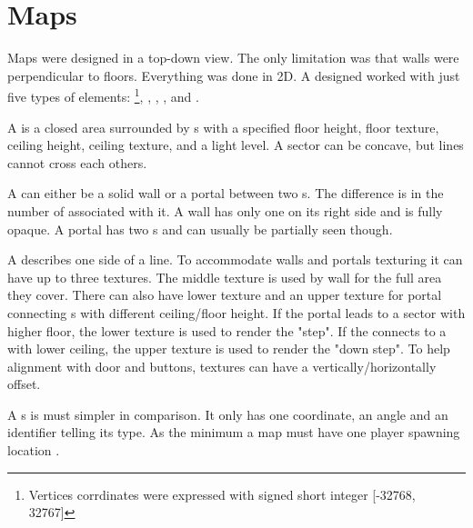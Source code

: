 

\section{Maps}
Maps were designed in a top-down view. The only limitation was that walls were perpendicular to floors. Everything was done in 2D. A designed worked with just five types of elements: \footnote{Vertices corrdinates were expressed with signed short integer [-32768, 32767]}, , , , and .\\
\par
{}

\par
A  is a closed area surrounded by s with a specified floor height, floor texture, ceiling height, ceiling texture, and a light level. A sector can be concave, but lines cannot cross each others.\\
\par
A  can either be a solid wall or a portal between two s. The difference is in the number of  associated with it. A wall has only one  on its right side and is fully opaque. A portal has two s and can usually be partially seen though.\\
\par
A  describes one side of a line. To accommodate walls and portals texturing it can have up to three textures. The middle texture is used by wall for the full area they cover. There can also have lower texture and an upper texture for portal connecting s with different ceiling/floor height. If the portal leads to a sector with higher floor, the lower texture is used to render the "step". If the  connects to a  with lower ceiling, the upper texture is used to render the "down step". To help alignment with door and buttons,  textures can have a vertically/horizontally offset. \\
\par
A s is must simpler in comparison. It only has one  coordinate, an angle and an identifier telling its type. As the minimum a map must have one player spawning location .\\

